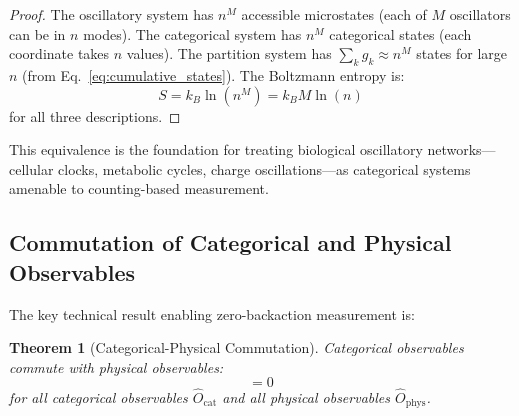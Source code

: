 \documentclass[twocolumn,10pt]{article}
\newtheorem{theorem}{Theorem}[section]
\begin{document}
\begin{proof}
The oscillatory system has $n^M$ accessible microstates (each of $M$ oscillators can be in $n$ modes). The categorical system has $n^M$ categorical states (each coordinate takes $n$ values). The partition system has $\sum_{k} g_k \approx n^M$ states for large $n$ (from Eq.~\ref{eq:cumulative_states}). The Boltzmann entropy is:
\begin{equation}
    S = k_B \ln(n^M) = k_B M \ln(n)
\end{equation}
for all three descriptions.
\end{proof}

This equivalence is the foundation for treating biological oscillatory networks---cellular clocks, metabolic cycles, charge oscillations---as categorical systems amenable to counting-based measurement.

\subsection{Commutation of Categorical and Physical Observables}

The key technical result enabling zero-backaction measurement is:

\begin{theorem}[Categorical-Physical Commutation]
\label{thm:commutation}
Categorical observables commute with physical observables:
\begin{equation}
    [\hat{O}_{\text{cat}}, \hat{O}_{\text{phys}}] = 0
    \label{eq:commutation}
\end{equation}
for all categorical observables $\hat{O}_{\text{cat}}$ and all physical observables $\hat{O}_{\text{phys}}$.
\end{theorem}
\end{document}
